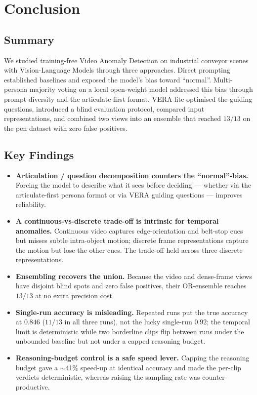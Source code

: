 \chapter{Conclusion}
\label{chap:conclusion}

\section{Summary}
We studied training-free Video Anomaly Detection on industrial conveyor scenes with
Vision-Language Models through three approaches. Direct prompting established baselines
and exposed the model's bias toward ``normal''. Multi-persona majority voting on a local
open-weight model addressed this bias through prompt diversity and the articulate-first
format. VERA-lite optimised the guiding questions, introduced a blind evaluation
protocol, compared input representations, and combined two views into an ensemble that
reached $13/13$ on the pen dataset with zero false positives.

\section{Key Findings}
\begin{itemize}
  \item \textbf{Articulation / question decomposition counters the ``normal''-bias.}
        Forcing the model to describe what it sees before deciding --- whether via the
        articulate-first persona format or via VERA guiding questions --- improves
        reliability.
  \item \textbf{A continuous-vs-discrete trade-off is intrinsic for temporal anomalies.}
        Continuous video captures edge-orientation and belt-stop cues but misses subtle
        intra-object motion; discrete frame representations capture the motion but lose
        the other cues. The trade-off held across three discrete representations.
  \item \textbf{Ensembling recovers the union.} Because the video and dense-frame views
        have disjoint blind spots and zero false positives, their OR-ensemble reaches
        $13/13$ at no extra precision cost.
  \item \textbf{Single-run accuracy is misleading.} Repeated runs put the true accuracy
        at $0.846$ ($11/13$ in all three runs), not the lucky single-run $0.92$; the
        temporal limit is deterministic while two borderline clips flip between runs
        under the unbounded baseline but not under a capped reasoning budget.
  \item \textbf{Reasoning-budget control is a safe speed lever.} Capping the reasoning
        budget gave a $\sim$41\% speed-up at identical accuracy and made the per-clip
        verdicts deterministic, whereas raising the sampling rate was counter-productive.
\end{itemize}

